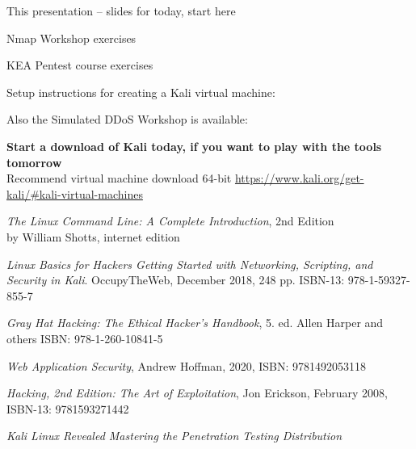 \documentclass[Screen16to9,17pt]{foils}
\begin{document}

\begin{list2}
\item This presentation -- slides for today, start here
\item Nmap Workshop exercises\\{\footnotesize
{}}
\item KEA Pentest course exercises\\{\footnotesize
{}}
\item Setup instructions for creating a Kali virtual machine:\\
\item Also the Simulated DDoS Workshop is available:\\{\footnotesize
{}}
\end{list2}


{\bf Start a download of Kali today, if you want to play with the tools tomorrow}\\
Recommend virtual machine download 64-bit \url{https://www.kali.org/get-kali/#kali-virtual-machines}


\begin{list2}
\item \emph{The Linux Command Line: A Complete Introduction}, 2nd Edition\\
 by William Shotts, internet edition 
\item \emph{Linux Basics for Hackers Getting Started with Networking, Scripting, and Security in Kali}. OccupyTheWeb, December 2018, 248 pp. ISBN-13: 978-1-59327-855-7
\item \emph{Gray Hat Hacking: The Ethical Hacker's Handbook}, 5. ed. Allen Harper and others ISBN: 978-1-260-10841-5
\item \emph{Web Application Security}, Andrew Hoffman, 2020, ISBN: 9781492053118
\item \emph{Hacking, 2nd Edition: The Art of Exploitation}, Jon Erickson, February 2008, ISBN-13: 9781593271442
\item \emph{Kali Linux Revealed Mastering the Penetration Testing Distribution}\\
\end{list2}
\end{document}
